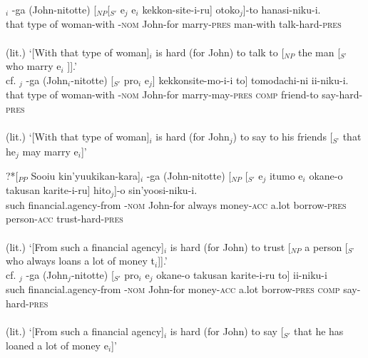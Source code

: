 \documentclass[output=paper,colorlinks,citecolor=brown,
]{langscibook}
\begin{document}
\begin{exe}
\ex \label{13ha}
\begin{xlist}
\ex \label{13aha}
$_{i}$ -ga (John-nitotte) [$_{NP}$[$_{S'}$ e$_{j}$ e$_{i}$ kekkon-site-i-ru] otoko$_{j}$]-to hanasi-niku-i.\\
{} that  type of woman-with -\textsc{nom} John-for {} {} {} marry-\textsc{pres} man-with talk-hard-\textsc{pres}\\\\
(lit.) ‘[With that type of woman]$_{i}$ is hard (for John) to talk to [$_{NP}$ the man [$_{S’}$ who marry e$_{i}$ ]].’\\ 
cf. $_{j}$ -ga (John$_{i}$-nitotte) [$_{S'}$ pro$_{i}$ e$_{j}$] kekkonsite-mo-i-i  to] tomodachi-ni ii-niku-i.\\
{} that  type of woman-with -\textsc{nom} John-for {} {} {} marry-may-\textsc{pres} \textsc{comp} friend-to say-hard-\textsc{pres}\\\\
(lit.) ‘[With that type of woman]$_{i}$ is hard (for John$_{j}$) to say to his friends [$_{S’}$ that he$_{j}$ may marry e$_{i}$]’


\ex \label{13bha}
\gll ?*[$_{PP}$ Sooiu kin'yuukikan-kara]$_{i}$  -ga     (John-nitotte) [$_{NP}$ [$_{S'}$ e$_{j}$ itumo e$_{i}$ okane-o      takusan karite-i-ru]    hito$_{j}$]-o  sin'yoosi-niku-i.\\
{} such financial.agency-from -\textsc{nom} John-for {} {} {} always {} money-\textsc{acc} a.lot borrow-\textsc{pres} person-\textsc{acc} trust-hard-\textsc{pres}\\\\
(lit.) ‘[From such a financial agency]$_{i}$ is hard (for John) to trust [$_{NP}$ a person [$_{S’}$ who always loans a lot of money t$_{i}$]].’\\
cf. $_{j}$ -ga (John$_{j}$-nitotte) [$_{S'}$ pro$_{i}$ e$_{j}$ okane-o takusan karite-i-ru to] ii-niku-i\\
{} such financial.agency-from -\textsc{nom} John-for {} {} {} money-\textsc{acc} a.lot borrow-\textsc{pres} \textsc{comp} say-hard-\textsc{pres}\\\\
(lit.) ‘[From such a financial agency]$_{i}$ is hard (for John) to say [$_{S'}$ that he has loaned a lot of money e$_{i}$]’ 

\end{xlist}
\end{exe}
\end{document}
